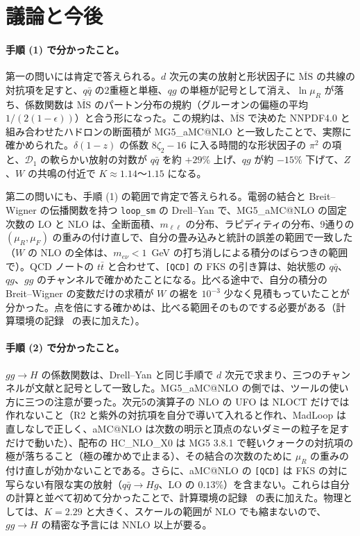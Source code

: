 \documentclass[a4paper,10pt]{ltjsarticle}
\makeatletter
\newcommand{\MSbar}{\overline{\mathrm{MS}}}
\newcommand{\MGaMC}{MG5\_aMC@NLO}
\makeatother
\begin{document}
\section{議論と今後}\label{sec:discussion}

\paragraph{手順 (1) で分かったこと。}第一の問いには肯定で答えられる。$d$ 次元の実の放射と形状因子に $\MSbar$ の共線の対抗項を足すと、$q\bar q$ の2重極と単極、$qg$ の単極が記号として消え、$\ln\mu_R$ が落ち、係数関数は $\MSbar$ のパートン分布の規約（グルーオンの偏極の平均 $1/(2(1-\epsilon))$）と合う形になった。この規約は、$\MSbar$ で決めた NNPDF4.0 と組み合わせたハドロンの断面積が \MGaMC{} と一致したことで、実際に確かめられた。$\delta(1-z)$ の係数 $8\zeta_2-16$ に入る時間的な形状因子の $\pi^2$ の項と、$\mathcal D_1$ の軟らかい放射の対数が $q\bar q$ を約 $+29\%$ 上げ、$qg$ が約 $-15\%$ 下げて、$Z$、$W$ の共鳴の付近で $K\approx1.14$〜$1.15$ になる。

第二の問いにも、手順 (1) の範囲で肯定で答えられる。電弱の結合と Breit--Wigner の伝播関数を持つ \texttt{loop\_sm} の Drell--Yan で、\MGaMC{} の固定次数の LO と NLO は、全断面積、$m_{\ell\ell}$ の分布、ラピディティの分布、9通りの $(\mu_R,\mu_F)$ の重みの付け直しで、自分の畳み込みと統計の誤差の範囲で一致した（$W$ の NLO の全体は、$m_{e\nu}<1$~GeV の打ち消しによる積分のばらつきの範囲で）。QCD ノートの $t\bar t$ と合わせて、\texttt{[QCD]} の FKS の引き算は、始状態の $q\bar q$、$qg$、$gg$ のチャンネルで確かめたことになる。比べる途中で、自分の積分の Breit--Wigner の変数だけの求積が $W$ の裾を $10^{-3}$ 少なく見積もっていたことが分かった。点を倍にする確かめは、比べる範囲そのものでする必要がある（計算環境の記録~\cite{env} の表に加えた）。

\paragraph{手順 (2) で分かったこと。}$gg\to H$ の係数関数は、Drell--Yan と同じ手順で $d$ 次元で求まり、三つのチャンネルが文献と記号として一致した。\MGaMC{} の側では、ツールの使い方に三つの注意が要った。次元5の演算子の NLO の UFO は NLOCT だけでは作れないこと（R2 と紫外の対抗項を自分で導いて入れると作れ、MadLoop は直しなしで正しく、aMC@NLO は次数の明示と頂点のないダミーの粒子を足すだけで動いた）、配布の HC\_NLO\_X0 は MG5 3.8.1 で軽いクォークの対抗項の極が落ちること（極の確かめで止まる）、その結合の次数のために $\mu_R$ の重みの付け直しが効かないことである。さらに、aMC@NLO の \texttt{[QCD]} は FKS の対に写らない有限な実の放射（$q\bar q\to Hg$、LO の $0.13\%$）を含まない。これらは自分の計算と並べて初めて分かったことで、計算環境の記録~\cite{env} の表に加えた。物理としては、$K=2.29$ と大きく、スケールの範囲が NLO でも縮まないので、$gg\to H$ の精密な予言には NNLO 以上が要る。
\end{document}
